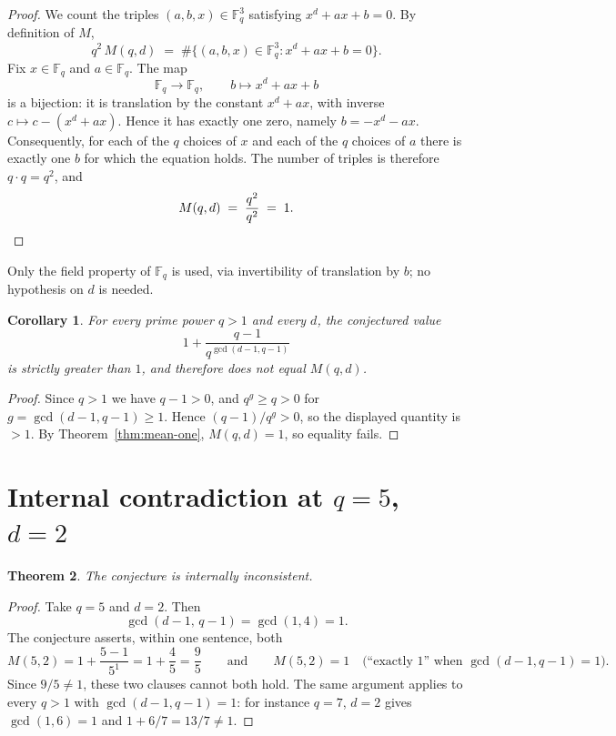 \documentclass[11pt]{article}
\newtheorem{theorem}{Theorem}
\newtheorem{corollary}[theorem]{Corollary}
\theoremstyle{definition}
\theoremstyle{remark}
\begin{document}
\begin{proof}
We count the triples $(a,b,x) \in \mathbb{F}_q^3$ satisfying
$x^d + ax + b = 0$. By definition of $M$,
\[
q^2 \, M(q,d) \;=\; \#\{(a,b,x) \in \mathbb{F}_q^3 : x^d + ax + b = 0\}.
\]
Fix $x \in \mathbb{F}_q$ and $a \in \mathbb{F}_q$. The map
\[
\mathbb{F}_q \to \mathbb{F}_q, \qquad b \mapsto x^d + ax + b
\]
is a bijection: it is translation by the constant $x^d + ax$, with inverse
$c \mapsto c - (x^d+ax)$. Hence it has exactly one zero, namely
$b = -x^d - ax$. Consequently, for each of the $q$ choices of $x$ and each of the
$q$ choices of $a$ there is exactly one $b$ for which the equation holds. The
number of triples is therefore $q \cdot q = q^2$, and
\[
M(q,d) \;=\; \frac{q^2}{q^2} \;=\; 1. \qedhere
\]
\end{proof}

Only the field property of $\mathbb{F}_q$ is used, via invertibility of translation
by $b$; no hypothesis on $d$ is needed.

\begin{corollary}\label{cor:main-term-wrong}
For every prime power $q>1$ and every $d$, the conjectured value
\[
1 + \frac{q-1}{q^{\gcd(d-1,q-1)}}
\]
is strictly greater than $1$, and therefore does not equal $M(q,d)$.
\end{corollary}

\begin{proof}
Since $q>1$ we have $q-1>0$, and $q^{g} \ge q > 0$ for $g = \gcd(d-1,q-1) \ge 1$.
Hence $(q-1)/q^{g} > 0$, so the displayed quantity is $>1$. By
Theorem~\ref{thm:mean-one}, $M(q,d)=1$, so equality fails.
\end{proof}

\section{Internal contradiction at $q=5$, $d=2$}

\begin{theorem}\label{thm:contradiction}
The conjecture is internally inconsistent.
\end{theorem}

\begin{proof}
Take $q = 5$ and $d = 2$. Then
\[
\gcd(d-1,\,q-1) = \gcd(1,4) = 1.
\]
The conjecture asserts, within one sentence, both
\[
M(5,2) = 1 + \frac{5-1}{5^{1}} = 1 + \frac{4}{5} = \frac{9}{5}
\qquad\text{and}\qquad
M(5,2) = 1 \quad\text{(``exactly $1$'' when $\gcd(d-1,q-1)=1$).}
\]
Since $9/5 \ne 1$, these two clauses cannot both hold. The same argument applies to
every $q>1$ with $\gcd(d-1,q-1)=1$: for instance $q=7$, $d=2$ gives
$\gcd(1,6)=1$ and $1+6/7 = 13/7 \ne 1$.
\end{proof}
\end{document}
